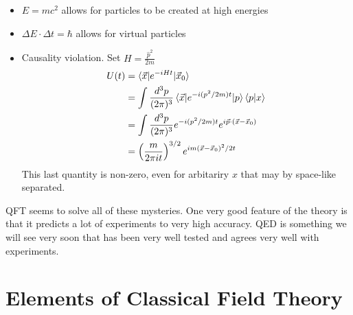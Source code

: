 \documentclass{report}
\theoremstyle{plain}
\theoremstyle{definition}
\theoremstyle{remark}
\newcommand{\FR}[2]{\frac{#1}{#2}}
\newcommand{\PFR}[2]{\left(\frac{#1}{#2}\right)}
\newcommand{\hp}{\hat p}
\begin{document}
\begin{itemize}
        \item $E=mc^2$ allows for particles to be created at high energies
        \item $\Delta E\cdot \Delta t = \hbar$ allows for virtual
            particles
        \item Causality violation. Set $H = \FR{\hp^2}{2m}$
            \begin{align*}
                U(t) &= \braket{\vec x|e^{-iHt}|\vec x_0}\\
                     &= \int \FR{d^3p}{(2\pi)^3} \braket{\vec
                         x|e^{-i(p^2/2m)t}|p}\braket{p|x}\\
 &= \int \FR{d^3p}{(2\pi)^3} e^{-i(p^2/2m)t}e^{i\vec p\cdot (\vec x-\vec x_0)}\\
                     &= \PFR{m}{2\pi i t}^{3/2} e^{im(\vec x-\vec x_0)^2/2t}
            \end{align*}
            This last quantity is non-zero, even for arbitariry $x$ that
            may by space-like separated.
    \end{itemize}
    QFT seems to solve all of these mysteries. One very good feature of the
    theory is that it predicts a lot of experiments to very high accuracy.
    QED is something we will see very soon that has been very well tested
    and agrees very well with experiments.
    
\section{Elements of Classical Field Theory}
\end{document}
